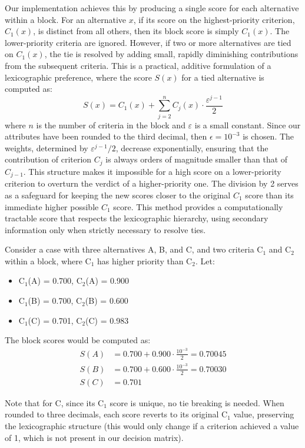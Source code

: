Our implementation achieves this by producing a single score for each alternative within a block. For an alternative $x$, if its score on the highest-priority criterion, $C_1(x)$, is distinct from all others, then its block score is simply $C_1(x)$. The lower-priority criteria are ignored. However, if two or more alternatives are tied on $C_1(x)$, the tie is resolved by adding small, rapidly diminishing contributions from the subsequent criteria. This is a practical, additive formulation of a lexicographic preference, where the score $S(x)$ for a tied alternative is computed as:
\begin{equation}
S(x) = C_1(x) + \sum_{j=2}^{n} C_j(x) \cdot \frac{\varepsilon^{j-1}}{2}
\end{equation}
where $n$ is the number of criteria in the block and $\varepsilon$ is a small constant. Since our attributes have been rounded to the third decimal, then $\epsilon = 10^{-3}$ is chosen. The weights, determined by $\varepsilon^{j-1}/2$, decrease exponentially, ensuring that the contribution of criterion $C_j$ is always orders of magnitude smaller than that of $C_{j-1}$. This structure makes it impossible for a high score on a lower-priority criterion to overturn the verdict of a higher-priority one. The division by 2 serves as a safeguard for keeping the new scores closer to the original $C_1$ score than its immediate higher possible $C_1$ score. This method provides a computationally tractable score that respects the lexicographic hierarchy, using secondary information only when strictly necessary to resolve ties.\\

\begin{example}
Consider a case with three alternatives A, B, and C, and two criteria C$_1$ and C$_2$ within a block, where C$_1$ has higher priority than C$_2$. Let:

\begin{itemize}
    \item C$_1$(A) = 0.700, C$_2$(A) = 0.900
    \item C$_1$(B) = 0.700, C$_2$(B) = 0.600
    \item C$_1$(C) = 0.701, C$_2$(C) = 0.983
\end{itemize}

The block scores would be computed as:
\begin{align*}
    S(A) &= 0.700 + 0.900 \cdot \frac{10^{-3}}{2} = 0.70045\\
    S(B) &= 0.700 + 0.600 \cdot \frac{10^{-3}}{2} = 0.70030\\
    S(C) &= 0.701
\end{align*}

Note that for C, since its C$_1$ score is unique, no tie breaking is needed. When rounded to three decimals, each score reverts to its original C$_1$ value, preserving the lexicographic structure (this would only change if a criterion achieved a value of 1, which is not present in our decision matrix).
\end{example}

